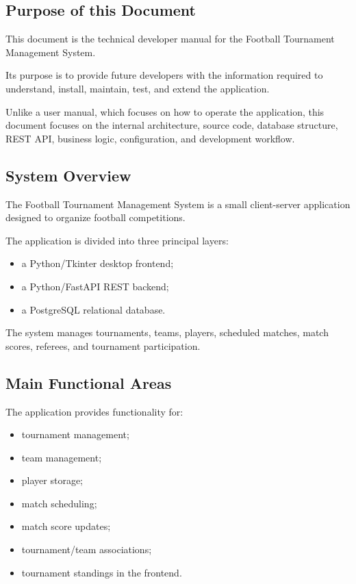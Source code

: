 \documentclass[12pt,a4paper]{article}
\begin{document}
\subsection{Purpose of this Document}

This document is the technical developer manual for the
Football Tournament Management System.

Its purpose is to provide future developers with the information
required to understand, install, maintain, test, and extend the
application.

Unlike a user manual, which focuses on how to operate the application,
this document focuses on the internal architecture, source code,
database structure, REST API, business logic, configuration, and
development workflow.

\subsection{System Overview}

The Football Tournament Management System is a small client-server
application designed to organize football competitions.

The application is divided into three principal layers:

\begin{itemize}
    \item a Python/Tkinter desktop frontend;
    \item a Python/FastAPI REST backend;
    \item a PostgreSQL relational database.
\end{itemize}

The system manages tournaments, teams, players, scheduled matches,
match scores, referees, and tournament participation.

\subsection{Main Functional Areas}

The application provides functionality for:

\begin{itemize}
    \item tournament management;
    \item team management;
    \item player storage;
    \item match scheduling;
    \item match score updates;
    \item tournament/team associations;
    \item tournament standings in the frontend.
\end{itemize}
\end{document}
